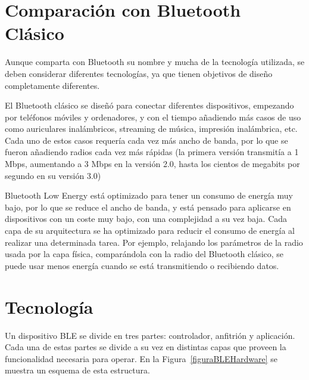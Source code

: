 \section{Comparación con Bluetooth Clásico}
\label{makereference2.1}

Aunque comparta con Bluetooth su nombre y mucha de la tecnología utilizada, se deben considerar diferentes tecnologías, ya que tienen objetivos de diseño completamente diferentes.

El Bluetooth clásico se diseñó para conectar diferentes dispositivos, empezando por teléfonos móviles y ordenadores, y con el tiempo añadiendo más casos de uso como auriculares inalámbricos, streaming de música, impresión inalámbrica, etc. Cada uno de estos casos requería cada vez más ancho de banda, por lo que se fueron añadiendo radios cada vez más rápidas (la primera versión transmitía a 1 Mbps, aumentando a 3 Mbps en la versión 2.0, hasta los cientos de megabits por segundo en su versión 3.0)

Bluetooth Low Energy está optimizado para tener un consumo de energía muy bajo, por lo que se reduce el ancho de banda, y está pensado para aplicarse en dispositivos con un coste muy bajo, con una complejidad a su vez baja. Cada capa de su arquitectura se ha optimizado para reducir el consumo de energía al realizar una determinada tarea. Por ejemplo, relajando los parámetros de la radio usada por la capa física, comparándola con la radio del Bluetooth clásico, se puede usar menos energía cuando se está transmitiendo o recibiendo datos.

\section{Tecnología}
\label{makereference2.2}

Un dispositivo BLE se divide en tres partes: controlador, anfitrión y aplicación. Cada una de estas partes se divide a su vez en distintas capas que proveen la funcionalidad necesaria para operar. En la Figura~\ref{figuraBLEHardware} se muestra un esquema de esta estructura.

